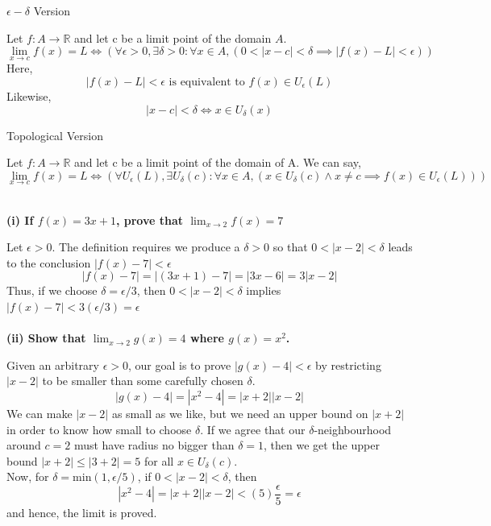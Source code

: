 \documentclass[12pt]{article}
\begin{document}
\underline{\textbf{}}

\begin{definition}{$\epsilon-\delta$ Version}

Let $f: A \to \mathbb{R}$ and let c be a limit point of the domain $A$. \[
    \lim_{x \to c} f(x) = L \iff (\forall \epsilon>0, \exists\delta>0 : \forall x \in A, (0 < |x-c| < \delta \implies |f(x)-L| < \epsilon))
\]
Here, \[
    |f(x)-L|<\epsilon \text{ is equivalent to } f(x) \in U_\epsilon(L)
\]
Likewise, \[
    |x-c|<\delta \iff x \in U_\delta(x)
\]
\end{definition}

\begin{definition}{Topological Version}

    Let $f : A \to \mathbb{R}$ and let c be a limit point of the domain of A. We can say, \[
        \lim_{x \to c} f(x)=L \iff ( \forall U_\epsilon(L), \exists U_\delta(c) : \forall x \in A, ( x \in U_\delta(c) \land x \neq c \implies f(x) \in U_\epsilon(L) ) )
    \] \\
\end{definition}


\begin{example}{\textbf{(i) If $f(x) = 3x+1$, prove that $ \lim_{x \to 2} f(x) = 7 $}}

    Let $\epsilon>0$. The definition requires we produce a $\delta>0$ so that $0<|x-2|<\delta$ leads to the conclusion $|f(x)-7|<\epsilon$ \[
        |f(x)-7| = |(3x+1)-7| = |3x-6| = 3|x-2|
    \]
    Thus, if we choose $\delta=\epsilon/3$, then $0<|x-2|<\delta$ implies $|f(x)-7|<3(\epsilon/3)=\epsilon$ \\~\\
    \textbf{(ii) Show that $\lim_{x \to 2} g(x) = 4$ where $g(x)=x^2$.}
    
    Given an arbitrary $\epsilon>0$, our goal is to prove $|g(x)-4|<\epsilon$ by restricting $| x-2 |$ to be smaller than some carefully chosen $\delta$. \\\[
        |g(x)-4| = |x^2-4| = |x+2||x-2|
    \] We can make $|x-2|$ as small as we like, but we need an upper bound on $|x+2|$ in order to know how small to choose $\delta$. If we agree that our $\delta$-neighbourhood around $c=2$ must have radius no bigger than $\delta=1$, then we get the upper bound $|x+2|\le |3+2|=5$ for all $x\in U_\delta(c)$. \\
    Now, for $\delta=\text{min}(1,\epsilon/5)$, if $0<|x-2|<\delta$, then \[
        |x^2-4| = |x+2||x-2| < (5)\frac{\epsilon}{5} = \epsilon
    \] and hence, the limit is proved. \\~\\
\end{example}
\end{document}
